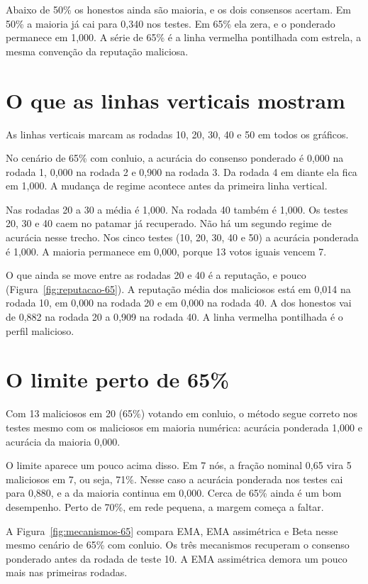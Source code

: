 \documentclass[11pt,a4paper]{article}
\begin{document}
Abaixo de 50\% os honestos ainda são maioria, e os dois consensos acertam.
Em 50\% a maioria já cai para 0{,}340 nos testes.
Em 65\% ela zera, e o ponderado permanece em 1{,}000.
A série de 65\% é a linha vermelha pontilhada com estrela, a mesma convenção da reputação maliciosa.

\section{O que as linhas verticais mostram}

As linhas verticais marcam as rodadas 10, 20, 30, 40 e 50 em todos os gráficos.

No cenário de 65\% com conluio, a acurácia do consenso ponderado é 0{,}000 na rodada 1, 0{,}000 na rodada 2 e 0{,}900 na rodada 3.
Da rodada 4 em diante ela fica em 1{,}000.
A mudança de regime acontece antes da primeira linha vertical.

Nas rodadas 20 a 30 a média é 1{,}000.
Na rodada 40 também é 1{,}000.
Os testes 20, 30 e 40 caem no patamar já recuperado.
Não há um segundo regime de acurácia nesse trecho.
Nos cinco testes (10, 20, 30, 40 e 50) a acurácia ponderada é 1{,}000.
A maioria permanece em 0{,}000, porque 13 votos iguais vencem 7.

O que ainda se move entre as rodadas 20 e 40 é a reputação, e pouco (Figura~\ref{fig:reputacao-65}).
A reputação média dos maliciosos está em 0{,}014 na rodada 10, em 0{,}000 na rodada 20 e em 0{,}000 na rodada 40.
A dos honestos vai de 0{,}882 na rodada 20 a 0{,}909 na rodada 40.
A linha vermelha pontilhada é o perfil malicioso.

\section{O limite perto de 65\%}

Com 13 maliciosos em 20 (65\%) votando em conluio, o método segue correto nos testes mesmo com os maliciosos em maioria numérica: acurácia ponderada 1{,}000 e acurácia da maioria 0{,}000.

O limite aparece um pouco acima disso.
Em 7 nós, a fração nominal 0{,}65 vira 5 maliciosos em 7, ou seja, 71\%.
Nesse caso a acurácia ponderada nos testes cai para 0{,}880, e a da maioria continua em 0{,}000.
Cerca de 65\% ainda é um bom desempenho.
Perto de 70\%, em rede pequena, a margem começa a faltar.

A Figura~\ref{fig:mecanismos-65} compara EMA, EMA assimétrica e Beta nesse mesmo cenário de 65\% com conluio.
Os três mecanismos recuperam o consenso ponderado antes da rodada de teste 10.
A EMA assimétrica demora um pouco mais nas primeiras rodadas.


\end{document}
